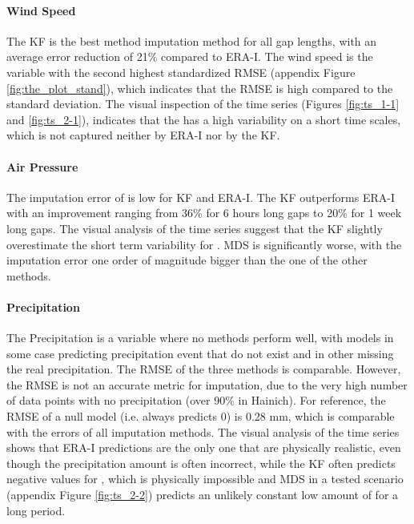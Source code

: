 \documentclass{article}
\begin{document}
\paragraph{Wind Speed} The KF is the best method imputation method for all gap lengths, with an average error reduction of 21\% compared to ERA-I. The wind speed is the variable with the second highest standardized RMSE (appendix Figure \ref{fig:the_plot_stand}), which indicates that the RMSE is high compared to the  standard deviation. The visual inspection of the time series (Figures \ref{fig:ts_1-1} and \ref{fig:ts_2-1}), indicates that the  has a high variability on a short time scales, which is not captured neither by ERA-I nor by the KF.

\paragraph{Air Pressure} The imputation error of  is low for KF and ERA-I. The KF outperforms ERA-I with an improvement ranging from 36\% for 6 hours long gaps to 20\% for 1 week long gaps. The visual analysis of the time series suggest that the KF slightly overestimate the short term variability for . MDS is significantly worse, with the imputation error one order of magnitude bigger than the one of the other methods.

\paragraph{Precipitation} The Precipitation is a variable where no methods perform well, with models in some case predicting precipitation event that do not exist and in other missing the real precipitation. The RMSE of the three methods is comparable. However, the RMSE is not an accurate metric for  imputation, due to the very high number of data points with no precipitation (over 90\% in Hainich). For reference, the RMSE of a null model (i.e. always predicts 0) is 0.28 \si{mm}, which is comparable with the errors of all imputation methods. 
The visual analysis of the time series shows that ERA-I predictions are the only one that are physically realistic, even though the precipitation amount is often incorrect, while the KF often predicts negative values for , which is physically impossible and MDS in a tested scenario (appendix Figure \ref{fig:ts_2-2}) predicts an unlikely constant low amount of  for a long period.
\end{document}
